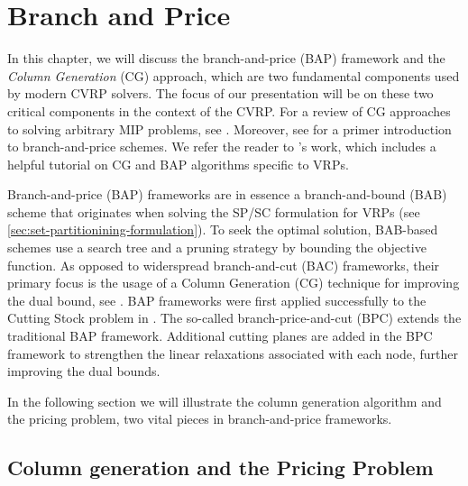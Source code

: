\chapter{Branch and Price}
\label{sec:branch-and-price}

In this chapter,
we will discuss the branch-and-price (BAP) framework and the \textit{Column Generation} (CG) approach,
which are two fundamental components used by modern CVRP solvers.
The focus of our presentation will be on these two critical components in the context of the CVRP.
For a review of CG approaches to solving arbitrary MIP problems, see \textcite{vanderbeck2005, lubbecke2005, desrosiers2011}.
Moreover, see \textcite{barnhart1998, desrosiers2005}
for a primer introduction to branch-and-price schemes.
We refer the reader to \textcite{feillet2010}'s work,
which includes a helpful tutorial on CG and BAP algorithms specific to VRPs.

Branch-and-price (BAP) frameworks are in essence a branch-and-bound (BAB) scheme \parencite{land2010}
that originates when solving the SP/SC formulation for VRPs (see \cref{sec:set-partitionining-formulation}).
To seek the optimal solution,
BAB-based schemes use a search tree and a pruning strategy by bounding the objective function.
As opposed to widerspread branch-and-cut (BAC) frameworks,
their primary focus is the usage of a Column Generation (CG) technique for improving the dual bound,
see \textcite{righini2008}.
BAP frameworks were first applied successfully to the Cutting Stock problem in \textcite{gilmore1961}.
The so-called branch-price-and-cut (BPC) extends the traditional BAP framework.
Additional cutting planes are added in the BPC framework to strengthen the linear relaxations
associated with each node, further improving the dual bounds.

In the following section 
we will illustrate the column generation algorithm
and the pricing problem, two vital pieces in branch-and-price frameworks.

\section{Column generation and the Pricing Problem}
\label{sec:column-generation-and-pricing-problem}

